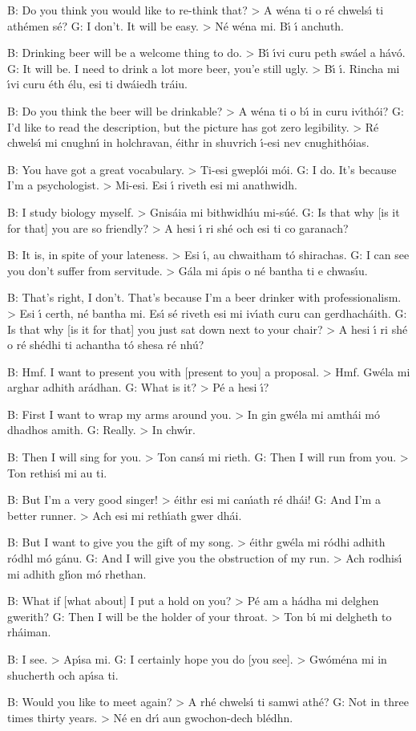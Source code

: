 B: Do you think you would like to re-think that? > A w\'{e}na ti o r\'{e} chwels\'{\i} ti ath\'{e}men s\'{e}?
G: I don't. It will be easy. > N\'{e} w\'{e}na mi. B\'{\i} \'{\i} anchuth.

B: Drinking beer will be a welcome thing to do. > B\'{\i} \'{\i}vi curu peth sw\'{a}el a h\'{a}v\'{o}.
G: It will be. I need to drink a lot more beer, you'e still ugly. > B\'{\i} \'{\i}. Rincha mi \'{\i}vi curu \'{e}th \'{e}lu, esi ti dw\'{a}iedh tr\'{a}iu.

B: Do you think the beer will be drinkable? > A w\'{e}na ti o b\'{\i} in curu iv\'{\i}th\'{o}i?
G: I'd like to read the description, but the picture has got zero legibility. > R\'{e} chwels\'{\i} mi cnughn\'{\i} in holchravan, \'{e}ithr in shuvrich \'{\i}-esi nev cnughith\'{o}ias.

B: You have got a great vocabulary. > Ti-esi gwepl\'{o}i m\'{o}i.
G: I do. It's because I'm a psychologist. > Mi-esi. Esi \'{\i} riveth esi mi anathwidh.

B: I study biology myself. > Gnis\'{a}ia mi bithwidh\'{\i}u mi-s\'{u}\'{e}.
G: Is that why [is it for that] you are so friendly? > A hesi \'{\i} ri sh\'{e} och esi ti co garanach?

B: It is, in spite of your lateness. > Esi \'{\i}, au chwaitham t\'{o} shirachas.
G: I can see you don't suffer from servitude. > G\'{a}la mi \'{a}pis o n\'{e} bantha ti e chwas\'{\i}u.

B: That's right, I don't. That's because I'm a beer drinker with professionalism. > Esi \'{\i} certh, n\'{e} bantha mi. Es\'{\i} s\'{e} riveth esi mi iv\'{\i}ath curu can gerdhach\'{a}ith.
G: Is that why [is it for that] you just sat down next to your chair? > A hesi \'{\i} ri sh\'{e} o r\'{e} sh\'{e}dhi ti achantha t\'{o} shesa r\'{e} nh\'{u}?

B: Hmf. I want to present you with [present to you] a proposal. > Hmf. Gw\'{e}la mi arghar adhith ar\'{a}dhan.
G: What is it? > P\'{e} a hesi \'{\i}?

B: First I want to wrap my arms around you. > In gin gw\'{e}la mi amth\'{a}i m\'{o} dhadhos amith.
G: Really. > In chw\'{\i}r.

B: Then I will sing for you. > Ton cans\'{\i} mi rieth.
G: Then I will run from you. > Ton rethis\'{\i} mi au ti.

B: But I'm a very good singer! > \'{e}ithr esi mi can\'{\i}ath r\'{e} dh\'{a}i!
G: And I'm a better runner. > Ach esi mi reth\'{\i}ath gwer dh\'{a}i.

B: But I want to give you the gift of my song. > \'{e}ithr gw\'{e}la mi r\'{o}dhi adhith r\'{o}dhl m\'{o} g\'{a}nu.
G: And I will give you the obstruction of my run. > Ach rodhis\'{\i} mi adhith gl\'{\i}on m\'{o} rhethan.

B: What if [what about] I put a hold on you? > P\'{e} am a h\'{a}dha mi delghen gwerith?
G: Then I will be the holder of your throat. > Ton b\'{\i} mi delgheth to rh\'{a}iman.

B: I see. > Ap\'{\i}sa mi.
G: I certainly hope you do [you see]. > Gw\'{o}m\'{e}na mi in shucherth och ap\'{\i}sa ti.

B: Would you like to meet again? > A rh\'{e} chwels\'{\i} ti samwi ath\'{e}?
G: Not in three times thirty years. > N\'{e} en dr\'{\i} aun gwochon-dech bl\'{e}dhn.
